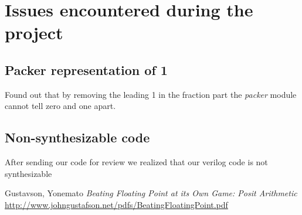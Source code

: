 \documentclass[10pt]{article}
\begin{document}
\section{Issues encountered during the project}\label{sec:issu-enco-during}

\subsection{Packer representation of 1}
\label{sec:pack-repr-1}

Found out that by removing the leading 1 in the fraction part the
\textit{packer} module cannot tell zero and one apart.

\subsection{Non-synthesizable code}
\label{sec:non-synth-code}

After sending our code for review we realized that our verilog code is not synthesizable


\begin{thebibliography}{99}
  Gustavson, Yonemato
  \textit{Beating Floating Point at its Own Game: Posit Arithmetic}
  \url{http://www.johngustafson.net/pdfs/BeatingFloatingPoint.pdf}

\end{thebibliography}
\end{document}
